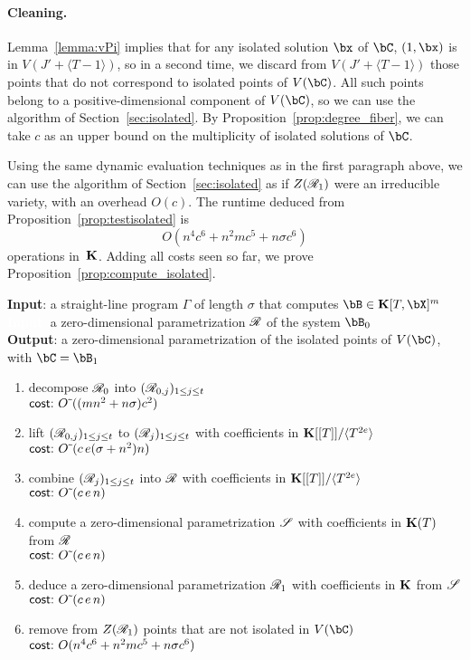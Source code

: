 \documentclass[12pt]{article}
\begin{document}
\paragraph{Cleaning.}
Lemma~\ref{lemma:vPi} implies that for any isolated solution $\bx$ of
$\bC$, $(1,\bx)$ is in $V(J' + \langle T-1\rangle)$, so in a second
time, we discard from $V(J' + \langle T-1\rangle)$ those points that
do not correspond to isolated points of $V(\bC)$. All such points
belong to a positive-dimensional component of $V(\bC)$, so we can use
the algorithm of Section~\ref{sec:isolated}. By
Proposition~\ref{prop:degree_fiber}, we can take $c$ as an upper bound
on the multiplicity of isolated solutions of $\bC$.

Using the same dynamic evaluation techniques as in the first paragraph
above, we can use the algorithm of Section~\ref{sec:isolated} as if
$Z(\mathscr{R}_1)$ were an irreducible variety, with an overhead 
$O(c)$. The runtime deduced from Proposition~\ref{prop:testisolated} is
$$O(n^4 c^6 + n^2 m c^5 + n \sigma c^6)$$ operations in~$\mathbf{K}$. Adding all
costs seen so far, we prove Proposition~\ref{prop:compute_isolated}.
\begin{algorithm}
\caption{$\mathsf{Homotopy}(\Gamma,\scrR)$}
{\bf Input}: a straight-line program $\Gamma$ of length $\sigma$ that computes $\bB \in \KK[T,\bX]^m$\\
\textcolor{white}{{\bf Input}:} a zero-dimensional parametrization $\mathscr{R}$ of the system $\bB_0$\\
{\bf Output}: a zero-dimensional parametrization of the isolated points of $V(\bC)$, with $\bC=\bB_1$
\begin{enumerate}
  \setlength\itemsep{0em}
\item decompose $\mathscr{R}_0$ into $(\mathscr{R}_{0,j})_{1 \leq j \leq t}$\\
$\text{\sf{cost:~}} {O}{\,\tilde{ }\,}((mn^2 + n\sigma) c^2)$
\item lift $(\mathscr{R}_{0,j})_{1 \leq j \leq t}$ to $(\mathscr{R}_j)_{1\leq j \leq t}$ with 
  coefficients in $\mathbf{K}[[T]]/\langle T^{2e}\rangle$\\
$\text{\sf{cost:~}} {O}{\,\tilde{ }\,}(c\,e (\sigma+n^2)n)$
\item combine $(\mathscr{R}_j)_{1 \leq j \leq t}$ into  $\mathscr{R}$ with coefficients in $\mathbf{K}[[T]]/\langle T^{2e}\rangle$\\
$\text{\sf{cost:~}} {O}{\,\tilde{ }\,}(c\,e\,n)$
\item compute a zero-dimensional parametrization $\mathscr{S}$ with coefficients in $\mathbf{K}(T)$ from $\mathscr{R}$\\
$\text{\sf{cost:~}} {O}{\,\tilde{ }\,}(c\,e\,n)$
\item deduce a zero-dimensional parametrization $\mathscr{R}_1$ with coefficients in $\mathbf{K}$ from $\mathscr{S}$\\
$\text{\sf{cost:~}} {O}{\,\tilde{ }\,}(c\,e\,n)$
\item remove from $Z(\mathscr{R}_1)$ points that are not isolated in $V(\bC)$ \\
$\text{\sf{cost:~}} O(n^4 c^6 + n^2 m c^5 + n \sigma c^6)$
\end{enumerate}
\label{DetSys}
\end{algorithm}
 
\end{document}
